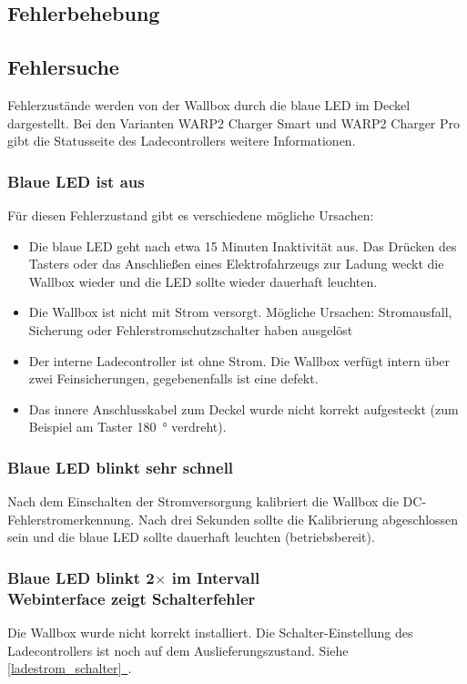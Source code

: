 \documentclass[a4paper,10pt]{article}
\newcommand*{\fullref}[1]{\hyperref[{#1}]{\ref*{#1}~\nameref*{#1}}}
\begin{document}
\begin{multicols*}{2}
	\newpage \section{Fehlerbehebung}\label{fehlerbehebung} \subsection{Fehlersuche}
	Fehlerzustände werden von der Wallbox durch die blaue LED im Deckel
	dargestellt. Bei den Varianten WARP2 Charger Smart und WARP2 Charger Pro gibt die Statusseite des Ladecontrollers
	weitere Informationen.

	\subsubsection*{Blaue LED ist aus}
	Für diesen Fehlerzustand gibt es verschiedene mögliche Ursachen:
	\begin{itemize}
		\item Die blaue LED geht nach etwa 15 Minuten Inaktivität aus. Das Drücken des Tasters
		      oder das Anschließen eines Elektrofahrzeugs zur Ladung weckt die Wallbox wieder
		      und die LED sollte wieder dauerhaft leuchten.
		\item Die Wallbox ist nicht mit Strom versorgt. Mögliche Ursachen: Stromausfall,
		      Sicherung oder Fehlerstrom\-schutzschalter haben ausgelöst
		\item Der interne Ladecontroller ist ohne Strom. Die Wallbox verfügt intern über zwei
		      Feinsicherungen, gegebenenfalls ist eine defekt.
		\item Das innere Anschlusskabel zum Deckel wurde nicht korrekt aufgesteckt (zum Beispiel am Taster \SI{180}{\degree} verdreht).
	\end{itemize}

	\subsubsection*{Blaue LED blinkt sehr schnell}\label{fast_blink}
	Nach dem Einschalten der Stromversorgung kalibriert die Wallbox die
	DC-Fehlerstromerkennung. Nach drei Sekunden sollte die Kalibrierung
	abgeschlossen sein und die blaue LED sollte dauerhaft leuchten
	(betriebsbereit).

	\subsubsection*{Blaue LED blinkt 2$\times$ im Intervall \\ Webinterface zeigt Schalterfehler}
	Die Wallbox wurde nicht korrekt installiert. Die Schalter-Einstellung des Ladecontrollers ist
	noch auf dem Auslieferungszustand. Siehe \fullref{ladestrom_schalter}.


\end{multicols*}
\end{document}
